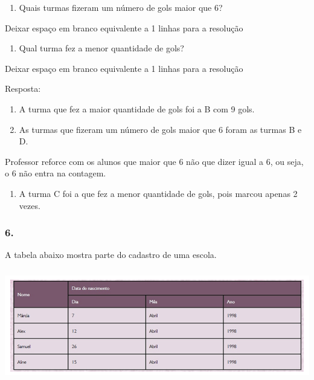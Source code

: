 \begin{enumerate}
\def\labelenumi{\alph{enumi})}
\item
  Quais turmas fizeram um número de gols maior que 6?
\end{enumerate}

Deixar espaço em branco equivalente a 1 linhas para a resolução

\begin{enumerate}
\def\labelenumi{\alph{enumi})}
\item
  Qual turma fez a menor quantidade de gols?
\end{enumerate}

Deixar espaço em branco equivalente a 1 linhas para a resolução

Resposta:

\begin{enumerate}
\def\labelenumi{\alph{enumi})}
\item
  A turma que fez a maior quantidade de gols foi a B com 9 gols.
\item
  As turmas que fizeram um número de gols maior que 6 foram as turmas B
  e D.
\end{enumerate}

Professor reforce com os alunos que maior que 6 não que dizer igual a 6,
ou seja, o 6 não entra na contagem.

\begin{enumerate}
\def\labelenumi{\alph{enumi})}
\item
  A turma C foi a que fez a menor quantidade de gols, pois marcou apenas
  2 vezes.
\end{enumerate}

\subsubsection{6.}\label{section-96}

A tabela abaixo mostra parte do cadastro de uma escola.

\includegraphics[width=5.90556in,height=1.93264in]{media/image98.png}

